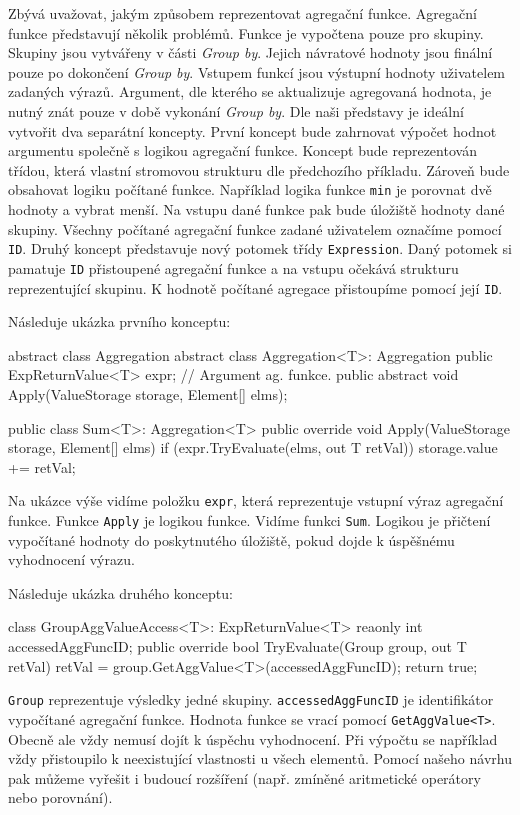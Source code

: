 Zbývá uvažovat, jakým způsobem reprezentovat agregační funkce.
Agregační funkce představují několik problémů.
Funkce je vypočtena pouze pro skupiny. 
Skupiny jsou vytvářeny v části \textit{Group by}.
Jejich návratové hodnoty jsou finální pouze po dokončení \textit{Group by}. 
Vstupem funkcí jsou výstupní hodnoty uživatelem zadaných výrazů.
Argument, dle kterého se aktualizuje agregovaná hodnota, je nutný znát pouze v době vykonání \textit{Group by}.
Dle naši představy je ideální vytvořit dva separátní koncepty.
První koncept bude zahrnovat výpočet hodnot argumentu společně s logikou agregační funkce.
Koncept bude reprezentován třídou, která vlastní stromovou strukturu dle předchozího příkladu.
Zároveň bude obsahovat logiku počítané funkce.
Například logika funkce \verb+min+ je porovnat dvě hodnoty a vybrat menší.
Na vstupu dané funkce pak bude úložiště hodnoty dané skupiny.
Všechny počítané agregační funkce zadané uživatelem označíme pomocí \verb+ID+.
Druhý koncept představuje nový potomek třídy \texttt{Expression}.
Daný potomek si pamatuje \verb+ID+ přistoupené agregační funkce a na vstupu očekává strukturu reprezentující skupinu.
K hodnotě počítané agregace přistoupíme pomocí její \verb+ID+.

Následuje ukázka prvního konceptu:
\begin{code}
abstract class Aggregation { }
abstract class Aggregation<T>: Aggregation {
  public ExpReturnValue<T> expr; // Argument ag. funkce.
  public abstract void Apply(ValueStorage storage, Element[] elms);
}

public class Sum<T>: Aggregation<T>{
  public override void Apply(ValueStorage storage, Element[] elms) {
    if (expr.TryEvaluate(elms, out T retVal)) {
      storage.value += retVal;
    }
  }
}
\end{code}
\clearpage
\noindent Na ukázce výše vidíme položku \verb+expr+, která reprezentuje vstupní výraz agregační funkce.
Funkce \verb+Apply+ je logikou funkce. 
Vidíme funkci \verb+Sum+. 
Logikou je přičtení vypočítané hodnoty do poskytnutého úložiště, pokud dojde k úspěšnému vyhodnocení výrazu.

Následuje ukázka druhého konceptu:
\begin{code}
class GroupAggValueAccess<T>: ExpReturnValue<T> {
  reaonly int accessedAggFuncID; 
  public override bool TryEvaluate(Group group, out T retVal) {
    retVal = group.GetAggValue<T>(accessedAggFuncID);
    return true; }}
\end{code}
\verb+Group+ reprezentuje výsledky jedné skupiny.
\verb+accessedAggFuncID+ je identifikátor vypočítané agregační funkce.
Hodnota funkce se vrací pomocí \verb+GetAggValue<T>+.
Obecně ale vždy nemusí dojít k úspěchu vyhodnocení.
Při výpočtu se například vždy přistoupilo k neexistující vlastnosti u všech elementů.
Pomocí našeho návrhu pak můžeme vyřešit i budoucí rozšíření (např. zmíněné aritmetické operátory nebo porovnání).

